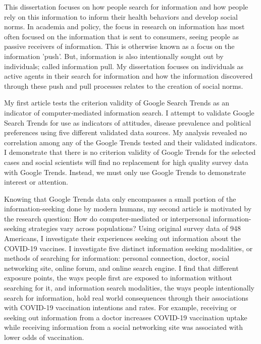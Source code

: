 
This dissertation focuses on how people search for information and how people
rely on this information to inform their health behaviors and develop social
norms. In academia and policy, the focus in research on 
information has most often focused on the information that is sent to 
consumers, seeing people as passive receivers of information. This
is otherwise known as a focus on the information 'push'. But, 
information is also intentionally sought out by individuals;
called information pull. My dissertation focuses on individuals as active agents 
in their search for information and how the information discovered through
these push and pull processes relates to the creation of social norms. 

My first article tests the criterion validity of Google Search Trends as
an indicator of computer-mediated information search. I attempt to
validate Google Search Trends for use as indicators of attitudes, disease prevalence
and political preferences using five different validated data sources. 
My analysis revealed no correlation among any of the Google Trends tested and their
validated indicators. I demonstrate that there is no criterion validity of
Google Trends for the selected cases and social scientists will find no replacement for
high quality survey data with Google Trends. Instead, we must only use 
Google Trends to demonstrate interest or attention. 

Knowing that Google Trends data only encompasses a small portion of the
information-seeking done by modern humans, my second article 
is motivated by the research question: How do computer-mediated or interpersonal 
information-seeking strategies vary across populations? Using original survey data
of 948 Americans, I investigate their experiences seeking out information about 
the COVID-19 vaccines. I investigate five distinct information seeking modalities, or methods of searching for information: 
personal connection, doctor, social networking site, online forum, and online search engine. 
I find that different exposure points, the ways people first are exposed to 
information without searching for it, and information search modalities, the 
ways people intentionally search for information, hold real world consequences
through their associations with COVID-19 vaccination intentions and rates.
For example, receiving or seeking out information from a doctor increases 
 COVID-19 vaccination uptake while receiving information from a social 
 networking site was associated with lower odds of vaccination.


